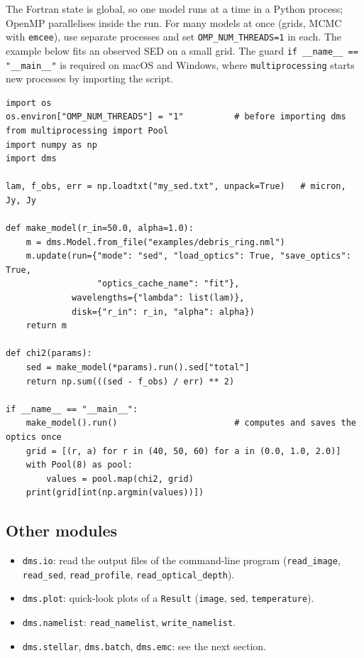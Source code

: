 \documentclass[11pt,a4paper]{article}
\newcommand{\code}[1]{\texttt{#1}}
\begin{document}
The Fortran state is global, so one model runs at a time in a Python process; OpenMP parallelises
inside the run. For many models at once (grids, MCMC with \code{emcee}), use separate processes
and set \code{OMP\_NUM\_THREADS=1} in each. The example below fits an observed SED on a small grid.
The guard \code{if \_\_name\_\_ == "\_\_main\_\_"} is required on macOS and Windows, where
\code{multiprocessing} starts new processes by importing the script.

\begin{lstlisting}[style=py]
import os
os.environ["OMP_NUM_THREADS"] = "1"          # before importing dms
from multiprocessing import Pool
import numpy as np
import dms

lam, f_obs, err = np.loadtxt("my_sed.txt", unpack=True)   # micron, Jy, Jy

def make_model(r_in=50.0, alpha=1.0):
    m = dms.Model.from_file("examples/debris_ring.nml")
    m.update(run={"mode": "sed", "load_optics": True, "save_optics": True,
                  "optics_cache_name": "fit"},
             wavelengths={"lambda": list(lam)},
             disk={"r_in": r_in, "alpha": alpha})
    return m

def chi2(params):
    sed = make_model(*params).run().sed["total"]
    return np.sum(((sed - f_obs) / err) ** 2)

if __name__ == "__main__":
    make_model().run()                       # computes and saves the optics once
    grid = [(r, a) for r in (40, 50, 60) for a in (0.0, 1.0, 2.0)]
    with Pool(8) as pool:
        values = pool.map(chi2, grid)
    print(grid[int(np.argmin(values))])
\end{lstlisting}

\subsection{Other modules}

\begin{itemize}
\item \code{dms.io}: read the output files of the command-line program (\code{read\_image},
      \code{read\_sed}, \code{read\_profile}, \code{read\_optical\_depth}).
\item \code{dms.plot}: quick-look plots of a \code{Result} (\code{image}, \code{sed},
      \code{temperature}).
\item \code{dms.namelist}: \code{read\_namelist}, \code{write\_namelist}.
\item \code{dms.stellar}, \code{dms.batch}, \code{dms.emc}: see the next section.
\end{itemize}
\end{document}
